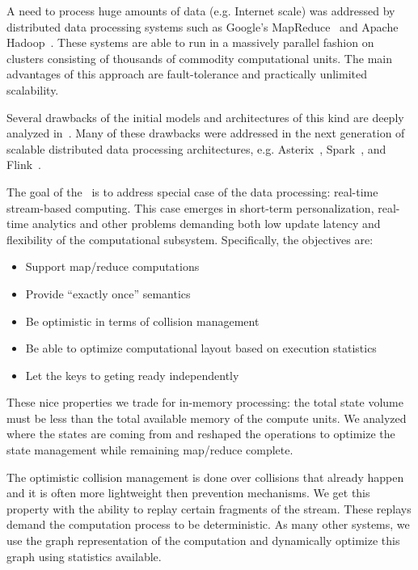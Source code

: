 
\label {fs-intro-seciton}

A need to process huge amounts of data (e.g. Internet scale) was addressed by distributed data processing systems such as Google's MapReduce~\cite{Dean:2008:MSD:1327452.1327492} and Apache Hadoop~\cite{hadoop2009hadoop}. These systems are able to run in a massively parallel fashion on clusters consisting of thousands of commodity computational units. The main advantages of this approach are fault-tolerance and practically unlimited scalability.

Several drawbacks of the initial models and architectures of this kind are deeply analyzed in~\cite{Doulkeridis:2014:SLA:2628707.2628782}. Many of these drawbacks were addressed in the next generation of scalable distributed data processing architectures, e.g. Asterix~\cite{Alsubaiee:2012:ASW:2331801.2331803}, Spark~\cite{Zaharia:2016:ASU:3013530.2934664}, 
and Flink~\cite{carbone2015apache}. 

The goal of the \FlameStream\ is to address special case of the data processing: real-time stream-based computing. This case emerges in short-term personalization, real-time analytics and other problems demanding both low update latency and flexibility of the computational subsystem. Specifically, the objectives are:

\begin {itemize}
\item Support map/reduce computations
\item Provide ``exactly once'' semantics
\item Be optimistic in terms of collision management
\item Be able to optimize computational layout based on execution statistics
\item Let the keys to geting ready independently
\end {itemize}

These nice properties we trade for in-memory processing: the total state volume must be less than the total available memory of the compute units. We analyzed where the states are coming from and reshaped the operations to optimize the state management while remaining map/reduce complete. 

The optimistic collision management is done over collisions that already happen and it is often more lightweight then prevention mechanisms. We get this property with the ability to replay certain fragments of the stream. These replays demand the computation process to be deterministic. As many other systems, we use the graph representation of the computation and dynamically optimize this graph using statistics available. 

